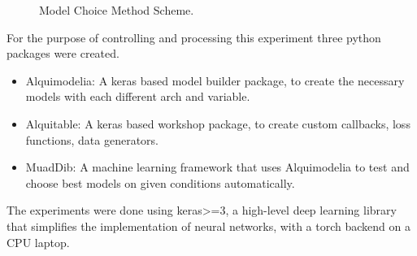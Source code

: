 \begin{figure}[H]
	\centering
	\resizebox{\linewidth}{!}{}
	\caption{Model Choice Method Scheme.}
	\label{fig:method_training}
\end{figure}

For the purpose of controlling and processing this experiment three python packages were created.

\begin{itemize}
    \item Alquimodelia: A keras based model builder package, to create the necessary models with each different arch and variable.
    \item Alquitable: A keras based workshop package, to create custom callbacks, loss functions, data generators.
    \item MuadDib: A machine learning framework that uses Alquimodelia to test and choose best models on given conditions automatically.
\end{itemize}

The experiments were done using keras>=3, a high-level deep learning library that simplifies the implementation of neural networks, with a torch backend on a CPU laptop.





